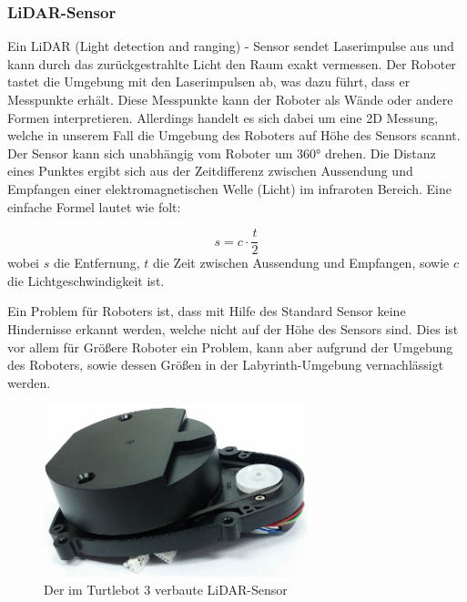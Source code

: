 {{{			%
		}
		
		\subsubsection{LiDAR-Sensor}
		{
			Ein LiDAR (Light detection and ranging) - Sensor sendet Laserimpulse aus und kann durch das zurückgestrahlte Licht den Raum exakt vermessen. Der Roboter tastet die Umgebung mit den Laserimpulsen ab, was dazu führt, dass er Messpunkte erhält. Diese Messpunkte kann der Roboter als Wände oder andere Formen interpretieren. Allerdings handelt es sich dabei um eine 2D Messung, welche in unserem Fall die Umgebung des Roboters auf Höhe des Sensors scannt. Der Sensor kann sich unabhängig vom Roboter um 360° drehen. 
			Die Distanz eines Punktes ergibt sich aus der Zeitdifferenz zwischen Aussendung und Empfangen einer elektromagnetischen Welle (Licht) im infraroten Bereich.
			Eine einfache Formel lautet wie folt:
			
			\begin{equation}
				s = c \cdot \frac{t}{2}
			\end{equation} 
			wobei $s$ die Entfernung, $t$ die Zeit zwischen Aussendung und Empfangen, sowie $c$ die Lichtgeschwindigkeit ist.
			
			Ein Problem für Roboters ist, dass mit Hilfe des Standard Sensor keine Hindernisse erkannt werden, welche nicht auf der Höhe des Sensors sind. Dies ist vor allem für Größere Roboter ein Problem, kann aber aufgrund der Umgebung des Roboters, sowie dessen Größen in der Labyrinth-Umgebung vernachlässigt werden.
			\begin{figure}
				\centering
				\includegraphics[height=5cm]{Bilder/lds_small.png}
				\caption{Der im Turtlebot 3 verbaute LiDAR-Sensor}
				\label{pic:lds_small}
			\end{figure}
		}
		
}}
